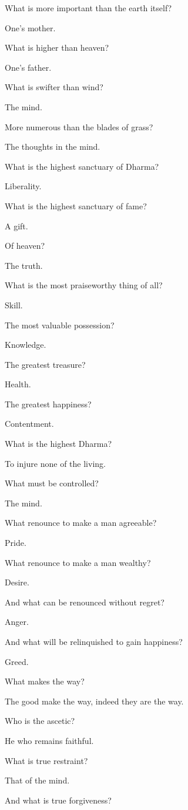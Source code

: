 What is more important than the earth itself?

One's mother.

What is higher than heaven?

One's father.

What is swifter than wind?

The mind.

More numerous than the blades of grass?

The thoughts in the mind.

What is the highest sanctuary of Dharma?

Liberality.

What is the highest sanctuary of fame?

A gift.

Of heaven?

The truth.

What is the most praiseworthy thing of all?

Skill.

The most valuable possession?

Knowledge.

The greatest treasure?

Health.

The greatest happiness?

Contentment.

What is the highest Dharma?

To injure none of the living.

What must be controlled?

The mind.

What renounce to make a man agreeable?

Pride.

What renounce to make a man wealthy?

Desire.

And what can be renounced without regret?

Anger.

And what will be relinquished to gain happiness?

Greed.

What makes the way?

The good make the way, indeed they are the way.

Who is the ascetic?

He who remains faithful.

What is true restraint?

That of the mind.

And what is true forgiveness?

